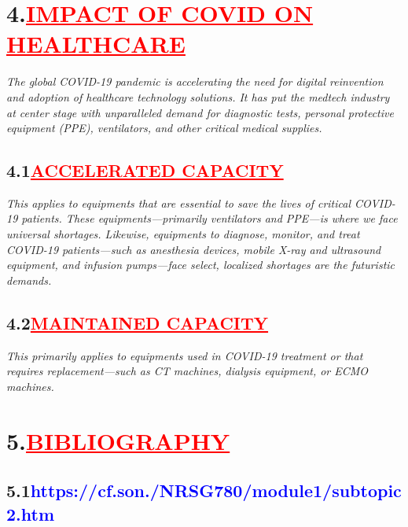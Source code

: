 \documentclass[12pt]{article}
\begin{document}
\section*{\textbf{4.\hspace{1cm}\textcolor{red}{\underline{\Large{IMPACT OF COVID ON HEALTHCARE}}}}}
\hspace{1cm}\large{\emph{The global COVID-19 pandemic is accelerating the need for digital reinvention and adoption of healthcare technology solutions. It has put the medtech industry at center stage with unparalleled demand for diagnostic tests, personal protective equipment (PPE), ventilators, and other critical medical supplies.}}
\subsection*{\textbf{\hspace{1cm}4.1\hspace{1cm}\textcolor{red}{\underline{\large{ACCELERATED CAPACITY}}}}} 
\hspace{1cm}\large{\emph{This applies to equipments that are essential to save the lives of critical COVID-19 patients. These equipments—primarily ventilators and PPE—is where we face universal shortages. Likewise, equipments to diagnose, monitor, and treat COVID-19 patients—such as anesthesia devices, mobile X-ray and ultrasound equipment, and infusion pumps—face select, localized shortages are the futuristic demands.}}
\subsection*{\textbf{\hspace{1cm}4.2\hspace{1cm}\textcolor{red}{\underline{\large{MAINTAINED CAPACITY}}}}}
\hspace{1cm}\large{\emph{This primarily applies to equipments used in COVID-19 treatment or that requires replacement—such as CT machines, dialysis equipment, or ECMO machines.}}
\newpage
\section*{\textbf{5.\hspace{1cm}\textcolor{red}{\underline{\huge{BIBLIOGRAPHY}}}}}
\vspace{0.2cm}
\subsection*{\textbf{5.1\hspace{1cm}\large{\textcolor{blue}{https://cf.son./NRSG780/module1/subtopic2.htm}}}}
\end{document}
